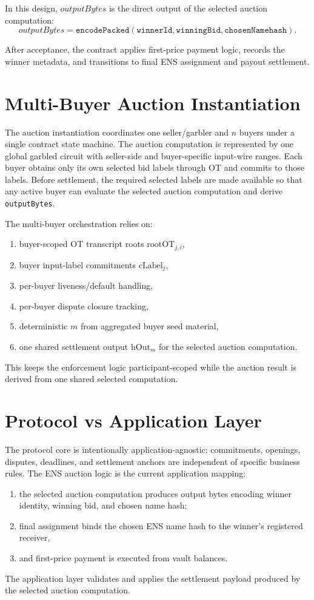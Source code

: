 \documentclass[final,twoside]{vutinfth}
\begin{document}
In this design, $outputBytes$ is the direct output of the selected auction
computation:
\[
outputBytes = \texttt{encodePacked}(\texttt{winnerId}, \texttt{winningBid}, \texttt{chosenNamehash}).
\]

After acceptance, the contract applies first-price payment logic, records the
winner metadata, and transitions to final ENS assignment and payout settlement.

\section{Multi-Buyer Auction Instantiation}
The auction instantiation coordinates one seller/garbler and $n$ buyers under a
single contract state machine. The auction computation is represented by one
global garbled circuit with seller-side and buyer-specific input-wire ranges.
Each buyer obtains only its own selected bid labels through OT and commits to
those labels. Before settlement, the required selected labels are made
available so that any active buyer can evaluate the selected auction
computation and derive \texttt{outputBytes}.

The multi-buyer orchestration relies on:
\begin{enumerate}
\item buyer-scoped OT transcript roots $\mathrm{rootOT}_{j,i}$,
\item buyer input-label commitments $\mathrm{cLabel}_j$,
\item per-buyer liveness/default handling,
\item per-buyer dispute closure tracking,
\item deterministic $m$ from aggregated buyer seed material,
\item one shared settlement output $\mathrm{hOut}_m$ for the selected auction computation.
\end{enumerate}
This keeps the enforcement logic participant-scoped while the auction result is derived
from one shared selected computation.

\section{Protocol vs Application Layer}
The protocol core is intentionally application-agnostic: commitments, openings,
disputes, deadlines, and settlement anchors are independent of specific
business rules. The ENS auction logic is the current application mapping:
\begin{enumerate}
\item the selected auction computation produces output bytes encoding winner identity, winning bid, and chosen name hash;
\item final assignment binds the chosen ENS name hash to the winner's registered receiver,
\item and first-price payment is executed from vault balances.
\end{enumerate}
The application layer validates and applies the settlement payload produced by
the selected auction computation.
\end{document}
